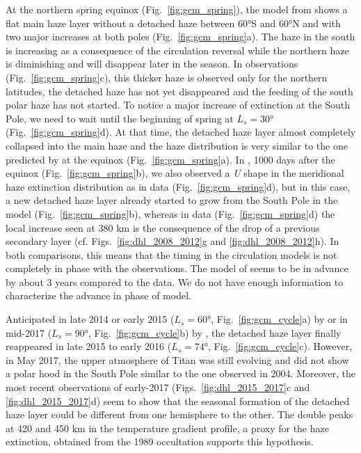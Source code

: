 At the northern spring equinox (Fig.~\ref{fig:gcm_spring}), the model from \cite{Lebonnois2012} shows a
flat main haze layer without a detached haze between \ang{60}S and \ang{60}N and with two major increases at both poles (Fig.~\ref{fig:gcm_spring}a).
The haze in the south is increasing as a consequence of the circulation reversal while the northern haze is diminishing
and will disappear later in the season. In observations (Fig.~\ref{fig:gcm_spring}c),
this thicker haze is observed only for the northern latitudes, the detached haze has not yet disappeared
and the feeding of the south polar haze has not started. To notice a major increase of extinction at the South Pole,
we need to wait until the beginning of spring at $L_s = \ang{30}$ (Fig.~\ref{fig:gcm_spring}d).
At that time, the detached haze layer almost completely collapsed into the main haze and the haze distribution is very
similar to the one predicted by \cite{Lebonnois2012} at the equinox (Fig.~\ref{fig:gcm_spring}a).
In \cite{Larson2015}, 1000 days after the equinox (Fig.~\ref{fig:gcm_spring}b), we also observed a \emph{U} shape in the meridional haze extinction distribution as in data (Fig.~\ref{fig:gcm_spring}d), but in this case, a new detached haze layer already started to grow from the South Pole in the model (Fig.~\ref{fig:gcm_spring}b), whereas in data (Fig.~\ref{fig:gcm_spring}d) the local increase seen at 380 km is the consequence of the drop of a previous secondary layer (cf. Figs.~\ref{fig:dhl_2008_2012}g and \ref{fig:dhl_2008_2012}h).
In both comparisons, this means that the timing in the circulation models is not completely in phase with the observations.
The model of \cite{Lebonnois2012} seems to be in advance by about 3 years compared to the data.
We do not have enough information to characterize the advance in phase of \cite{Larson2015} model.

Anticipated in late 2014 or early 2015 ($L_s = \ang{60}$, Fig.~\ref{fig:gcm_cycle}a) by \cite{Larson2015} or in mid-2017 ($L_s = \ang{90}$, Fig.~\ref{fig:gcm_cycle}b) by \cite{Lebonnois2012}, the detached haze layer
finally reappeared in late 2015 to early 2016 ($L_s = \ang{74}$, Fig.~\ref{fig:gcm_cycle}c).
However, in May 2017, the upper atmosphere of Titan was still evolving and did not show a polar hood in the South Pole
similar to the one observed in 2004. Moreover, the most recent observations of early-2017 (Figs.~\ref{fig:dhl_2015_2017}c and \ref{fig:dhl_2015_2017}d) seem to show that the seasonal
formation of the detached haze layer could be different from one hemisphere to the other. The double peaks at
420 and 450 km in the temperature gradient profile, a proxy for the haze extinction, obtained from the 1989
occultation \citep{Sicardy1999} supports this hypothesis.

